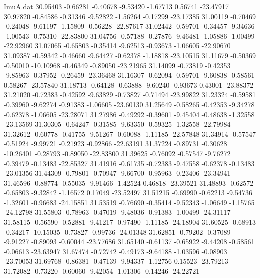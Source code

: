 \begin{filecontents}{ImuA.dat}
  30.95403   -0.66281   -0.40678   -9.53420   -1.67713    0.56741  -23.47917
  30.97820   -0.84586   -0.31346   -9.52822   -1.56264   -0.17299  -23.17385
  31.00119   -0.70469   -0.24048   -9.61197   -1.15809   -0.56228  -22.87617
  31.02442   -0.59701   -0.34457   -9.34636   -1.00543   -0.75310  -22.83800
  31.04756   -0.57188   -0.27876   -9.46481   -1.05886   -1.00499  -22.92960
  31.07065   -0.65803   -0.35414   -9.62513   -0.93673   -1.06605  -22.90670
  31.09387   -0.59342   -0.46660   -9.64427   -0.62378   -1.18818  -23.10515
  31.11679   -0.50369   -0.50010  -10.10968   -0.46349   -0.89050  -23.21965
  31.14099   -0.73819   -0.42353   -9.85963   -0.37952   -0.26459  -23.36468
  31.16307   -0.62094   -0.59701   -9.60838   -0.58561    0.58267  -23.57840
  31.18713   -0.64128   -0.63888   -9.60240   -0.93673    0.43001  -23.88372
  31.21020   -0.72383   -0.42592   -9.63829   -0.73827   -0.71494  -23.99822
  31.23324   -0.59581   -0.39960   -9.62274   -0.91383   -1.06605  -23.60130
  31.25649   -0.58265   -0.42353   -9.34278   -0.62378   -1.06605  -23.28071
  31.27986   -0.49292   -0.39601   -9.45404   -0.48638   -1.32558  -23.13569
  31.30305   -0.64247   -0.31585   -9.63350   -0.59325   -1.32558  -22.79984
  31.32612   -0.60778   -0.41755   -9.51267   -0.60088   -1.11185  -22.57848
  31.34914   -0.57547   -0.51924   -9.99721   -0.21923   -0.92866  -22.63191
  31.37224   -0.89731   -0.30628  -10.26401   -0.28793   -0.89050  -22.83800
  31.39625   -0.76092   -0.57547   -9.76272   -0.39479   -0.13483  -22.85327
  31.41916   -0.61735   -0.72383   -9.47558   -0.62378   -0.13483  -23.01356
  31.44309   -0.79801   -0.70947   -9.66700   -0.95963   -0.23406  -23.34941
  31.46596   -0.88774   -0.55035   -9.91466   -1.42524    0.46818  -23.39521
  31.48893   -0.62572   -0.65803   -9.32842   -1.16572    0.17049  -23.52497
  31.51215   -0.69990   -0.62213   -9.54736   -1.32601   -0.96683  -24.15851
  31.53519   -0.76690   -0.35414   -9.52343   -1.06649   -1.15765  -24.12798
  31.55803   -0.78963   -0.47019   -9.48036   -0.91383   -1.00499  -24.31117
  31.58115   -0.56590   -0.52881   -9.41217   -0.97490   -1.11185  -24.18904
  31.60525   -0.68913   -0.34217  -10.15035   -0.73827   -0.99736  -24.01348
  31.62851   -0.79202   -0.37089   -9.91227   -0.89093   -0.60044  -23.77686
  31.65140   -0.61137   -0.65922   -9.44208   -0.58561   -0.06613  -23.63947
  31.67474   -0.72742   -0.49173   -9.64188   -1.03596   -0.08903  -23.70053
  31.69768   -0.86381   -0.47139   -9.94337   -1.12756    0.15523  -23.79213
  31.72082   -0.73220   -0.60060   -9.42054   -1.01306   -0.14246  -24.22721

\end{filecontents}
